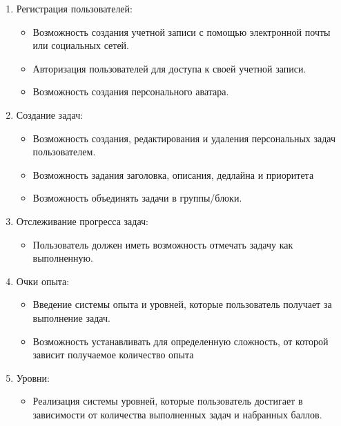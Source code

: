 \documentclass[../document.tex]{subfiles}
\begin{document}
\begin{enumerate}
  \item Регистрация пользователей:
        \begin{itemize}
          \item Возможность создания учетной записи с помощью электронной почты или социальных сетей.
          \item Авторизация пользователей для доступа к своей учетной записи.
          \item Возможность создания персонального аватара.
        \end{itemize}
  \item Создание задач:
  \begin{itemize}
    \item Возможность создания, редактирования и удаления персональных задач пользователем.
    \item Возможность задания заголовка, описания, дедлайна и приоритета
    \item Возможность объединять задачи в группы/блоки.
  \end{itemize}
  \item Отслеживание прогресса задач:
  \begin{itemize}
    \item Пользователь должен иметь возможность отмечать задачу как выполненную.
  \end{itemize}
  \item Очки опыта:
  \begin{itemize}
    \item Введение системы опыта и уровней, которые пользователь получает за выполнение задач.
    \item Возможность устанавливать для определенную сложность, от которой зависит получаемое количество опыта
  \end{itemize}
  \item Уровни:
  \begin{itemize}
    \item Реализация системы уровней, которые пользователь достигает в зависимости от количества выполненных задач и набранных баллов.
  \end{itemize}
\end{enumerate}
\end{document}
